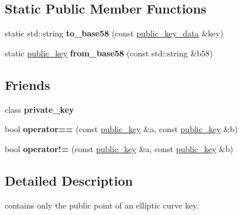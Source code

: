 \subsection*{Static Public Member Functions}
\begin{DoxyCompactItemize}
\item 
\mbox{\label{classfc_1_1ecc_1_1public__key_a3b3674442ad806a7072c0fab7b1b4882}} 
static std\+::string {\bfseries to\+\_\+base58} (const \mbox{\hyperlink{classfc_1_1array}{public\+\_\+key\+\_\+data}} \&key)
\item 
\mbox{\label{classfc_1_1ecc_1_1public__key_a1167b667bd6a9a67c65d09174d583427}} 
static \mbox{\hyperlink{classfc_1_1ecc_1_1public__key}{public\+\_\+key}} {\bfseries from\+\_\+base58} (const std\+::string \&b58)
\end{DoxyCompactItemize}
\subsection*{Friends}
\begin{DoxyCompactItemize}
\item 
\mbox{\label{classfc_1_1ecc_1_1public__key_ae1389c6c19ec8630ce31970de2294915}} 
class {\bfseries private\+\_\+key}
\item 
\mbox{\label{classfc_1_1ecc_1_1public__key_a4f2610bdec460bf2b0203684a9599da5}} 
bool {\bfseries operator==} (const \mbox{\hyperlink{classfc_1_1ecc_1_1public__key}{public\+\_\+key}} \&a, const \mbox{\hyperlink{classfc_1_1ecc_1_1public__key}{public\+\_\+key}} \&b)
\item 
\mbox{\label{classfc_1_1ecc_1_1public__key_a5faa639eb95ed12c1be5d8ae65c7cb54}} 
bool {\bfseries operator!=} (const \mbox{\hyperlink{classfc_1_1ecc_1_1public__key}{public\+\_\+key}} \&a, const \mbox{\hyperlink{classfc_1_1ecc_1_1public__key}{public\+\_\+key}} \&b)
\end{DoxyCompactItemize}


\subsection{Detailed Description}
contains only the public point of an elliptic curve key. 

